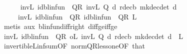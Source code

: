 \begin{isabellebody}
\ \ \ \ \isamarkupfalse%
\ {\isachardoublequoteopen}{\isacharparenleft}{\kern0pt}inv\isactrlsub L\ {\isacharparenleft}{\kern0pt}id{\isacharunderscore}{\kern0pt}blinfun\ {\isacharminus}{\kern0pt}\ {\isacharquery}{\kern0pt}QR{\isacharparenright}{\kern0pt}{\isacharparenright}{\kern0pt}\ {\isacharparenleft}{\kern0pt}{\isacharparenleft}{\kern0pt}inv\isactrlsub L\ {\isacharparenleft}{\kern0pt}Q\ d{\isacharparenright}{\kern0pt}{\isacharparenright}{\kern0pt}\ {\isacharparenleft}{\kern0pt}r{\isacharunderscore}{\kern0pt}dec\isactrlsub b\ {\isacharparenleft}{\kern0pt}mk{\isacharunderscore}{\kern0pt}dec{\isacharunderscore}{\kern0pt}det\ d{\isacharparenright}{\kern0pt}{\isacharparenright}{\kern0pt}{\isacharparenright}{\kern0pt}\isanewline
\ \ \ \ {\isasymle}\ {\isacharparenleft}{\kern0pt}inv\isactrlsub L\ {\isacharparenleft}{\kern0pt}id{\isacharunderscore}{\kern0pt}blinfun\ {\isacharminus}{\kern0pt}\ {\isacharquery}{\kern0pt}QR{\isacharparenright}{\kern0pt}{\isacharparenright}{\kern0pt}\ {\isacharparenleft}{\kern0pt}{\isacharparenleft}{\kern0pt}id{\isacharunderscore}{\kern0pt}blinfun\ {\isacharminus}{\kern0pt}\ {\isacharquery}{\kern0pt}QR{\isacharparenright}{\kern0pt}\ L{\isacharparenright}{\kern0pt}{\isachardoublequoteclose}\isanewline
\ \ \ \ \ \ \isamarkupfalse%
\ {\isacharparenleft}{\kern0pt}metis\ aux\ blinfun{\isachardot}{\kern0pt}diff{\isacharunderscore}{\kern0pt}right\ diff{\isacharunderscore}{\kern0pt}ge{\isacharunderscore}{\kern0pt}{}{\isacharunderscore}{\kern0pt}iff{\isacharunderscore}{\kern0pt}ge{\isacharparenright}{\kern0pt}\isanewline
\ \ \ \ \isamarkupfalse%
\ {\isachardoublequoteopen}{\isacharparenleft}{\kern0pt}inv\isactrlsub L\ {\isacharparenleft}{\kern0pt}id{\isacharunderscore}{\kern0pt}blinfun\ {\isacharminus}{\kern0pt}\ {\isacharquery}{\kern0pt}QR{\isacharparenright}{\kern0pt}\ o\isactrlsub L\ inv\isactrlsub L\ {\isacharparenleft}{\kern0pt}Q\ d{\isacharparenright}{\kern0pt}{\isacharparenright}{\kern0pt}\ {\isacharparenleft}{\kern0pt}r{\isacharunderscore}{\kern0pt}dec\isactrlsub b\ {\isacharparenleft}{\kern0pt}mk{\isacharunderscore}{\kern0pt}dec{\isacharunderscore}{\kern0pt}det\ d{\isacharparenright}{\kern0pt}{\isacharparenright}{\kern0pt}\ {\isasymle}\ L{\isachardoublequoteclose}\isanewline
\ \ \ \ \ \ \isamarkupfalse%
\ invertible\isactrlsub L{\isacharunderscore}{\kern0pt}inf{\isacharunderscore}{\kern0pt}sum{\isacharbrackleft}{\kern0pt}OF\ norm{\isacharunderscore}{\kern0pt}QR{\isacharunderscore}{\kern0pt}less{\isacharunderscore}{\kern0pt}one{\isacharbrackleft}{\kern0pt}OF\ that{\isacharbrackright}{\kern0pt}{\isacharbrackright}{\kern0pt}\isanewline

\end{isabellebody}
